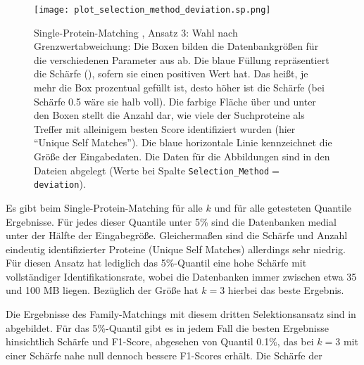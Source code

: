         \begin{figure}[H]
            \centering
            \texttt{[image: plot\_selection\_method\_deviation.sp.png]}
            \caption[Single-Protein-Matching , Ansatz 3: Wahl nach Grenzwertabweichung]{Single-Protein-Matching , Ansatz 3: Wahl nach Grenzwertabweichung: Die Boxen bilden die Datenbankgrößen für die verschiedenen Parameter aus  ab. Die blaue Füllung repräsentiert die Schärfe (), sofern sie einen positiven Wert hat. Das heißt, je mehr die Box prozentual gefüllt ist, desto höher ist die Schärfe (bei Schärfe 0.5 wäre sie halb voll). Die farbige Fläche über und unter den Boxen stellt die Anzahl dar, wie viele der Suchproteine als Treffer mit alleinigem besten Score identifiziert wurden (hier ``Unique Self Matches''). Die blaue horizontale Linie kennzeichnet die Größe der Eingabedaten. Die Daten für die Abbildungen sind in den Dateien  abgelegt (Werte bei Spalte \texttt{Selection\_Method}$=$\texttt{deviation}).}
            \label{fig:selection_method.deviation.sp}
        \end{figure}

        Es gibt beim Single-Protein-Matching für alle $k$ und für alle getesteten Quantile Ergebnisse. Für jedes dieser Quantile unter 5\% sind die Datenbanken medial unter der Hälfte der Eingabegröße. Gleichermaßen sind die Schärfe und Anzahl eindeutig identifizierter Proteine (Unique Self Matches) allerdings sehr niedrig. Für diesen Ansatz hat lediglich das 5\%-Quantil eine hohe Schärfe mit vollständiger Identifikationsrate, wobei die Datenbanken immer zwischen etwa 35 und 100 \acs{MB} liegen. Bezüglich der Größe hat $k=3$ hierbei das beste Ergebnis.

        Die Ergebnisse des Family-Matchings mit diesem dritten Selektionsansatz sind in  abgebildet. Für das 5\%-Quantil gibt es in jedem Fall die besten Ergebnisse hinsichtlich Schärfe und F1-Score, abgesehen von Quantil 0.1\%, das bei $k=3$ mit einer Schärfe nahe null dennoch bessere F1-Scores erhält. Die Schärfe der 

